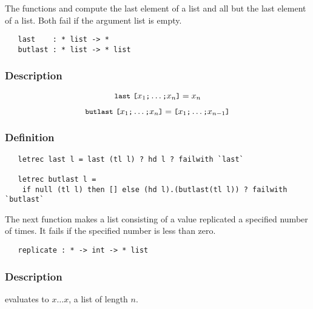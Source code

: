 \noindent The functions  and  compute the last element
of a list and all but the last element of a list. Both fail if the argument
list is empty.

\begin{boxed}
\begin{verbatim}
   last    : * list -> *
   butlast : * list -> * list
\end{verbatim}\end{boxed}

\subsubsection*{Description}

\[ \ml{last}\ \ml{[}x_1\ml{;}\ldots\ml{;}x_n\ml{]} = x_n \]

\[ \ml{butlast}\ \ml{[}x_1\ml{;}\ldots\ml{;}x_n\ml{]} =
\ml{[}x_1\ml{;}\ldots\ml{;}x_{n-1}\ml{]} \]

\subsubsection*{Definition}

\begin{hol}\begin{verbatim}
   letrec last l = last (tl l) ? hd l ? failwith `last`

   letrec butlast l =
    if null (tl l) then [] else (hd l).(butlast(tl l)) ? failwith `butlast`
\end{verbatim}\end{hol}


\noindent The next function makes a list consisting of a value replicated a
specified number of times. It fails if the specified number is less than zero.

\begin{boxed}
\begin{verbatim}
   replicate : * -> int -> * list
\end{verbatim}\end{boxed}

\subsubsection*{Description}

 evaluates to \ml{[}$x$\ml{;}$\ldots$\ml{;}$x$\ml{]},
a list of length $n$.

